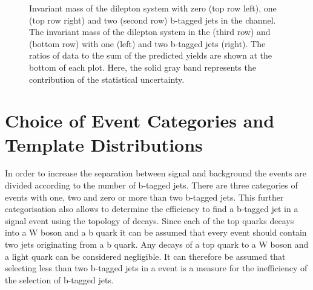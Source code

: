 \begin{figure}[htbp!]
\begin{center}

      \caption{Invariant mass of the dilepton system with zero (top row left), one (top row right) and two (second row) b-tagged 
      jets in the \emu channel. The invariant mass of the dilepton system in the \mumu (third row) and \ee (bottom row) with one (left)
      and two b-tagged jets (right).
        The ratios of data to the sum of the predicted yields are
        shown at the bottom of each plot. Here, the solid gray band
        represents the contribution of the statistical uncertainty.}  
       \label{fig:xsec_ctrplots_mll}
  \end{center}
\end{figure}



\section{Choice of Event Categories and Template Distributions}
\label{sec:xsec_templates}


In order to increase the separation between signal and background the events are divided according to the number of b-tagged jets.
There are three categories of events with one, two and zero or more than two b-tagged jets.
This further categorisation also allows to determine the efficiency to find a b-tagged jet in a signal event using the topology of \ttbar decays.
Since each of the top quarks decays into a W boson and a b quark it can be assumed that every \ttbar event should contain two jets originating from a b quark.
Any decays of a top quark to a W boson and a light quark can be considered negligible.
It can therefore be assumed that selecting less than two b-tagged jets in a \ttbar event is a measure for the inefficiency of the selection of b-tagged jets.

